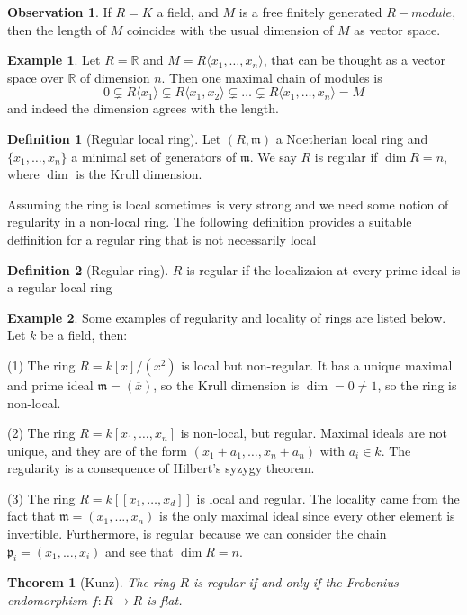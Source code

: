 \documentclass[leqno]{article}
\newtheorem{theorem}{Theorem}[section]
\theoremstyle{definition}
\newtheorem{definition}{Definition}[section]
\newtheorem{observation}{Observation}[section]
\newtheorem{example}{Example}[section]
\begin{document}
\begin{observation} If $R = K$ a field, and $M$ is a free finitely generated $R-module$, then the length of  $M$ coincides with the usual dimension of $M$ as vector space.
\end{observation}

\begin{example} Let $R = \mathbb{R}$ and $M = R\langle x_1, \ldots, x_n\rangle$, that can be thought as a vector space over $\mathbb{R}$ of dimension $n$. Then one maximal chain of modules is
  \[
  0\subsetneq R\langle x_1\rangle \subsetneq R \langle x_1 , x_2\rangle \subsetneq \ldots \subsetneq R\langle  x_1, \ldots, x_n \rangle = M
  \]
  and indeed the dimension agrees with the length.

\end{example}

\begin{definition}[Regular local ring] Let $(R, \mathfrak{m})$ a Noetherian local ring and $\{x_1, \ldots, x_n\}$ a minimal set of generators of $\mathfrak{m}$. We say $R$ is regular if $\dim R=n$, where  $\dim$ is the Krull dimension.
\end{definition}

Assuming the ring is local sometimes is very strong and we need some notion of regularity in a non-local ring. The following definition provides a suitable deffinition for a regular ring that is not necessarily local
\begin{definition}[Regular ring] $R$ is regular if the localizaion at every prime ideal is a regular local ring
\end{definition}

\begin{example} Some examples of regularity and locality of rings are listed below. Let $k$ be a field, then:

  (1) The ring $R = k[x] / (x^2)$ is local but non-regular. It has a unique maximal and prime ideal  $\mathfrak{m}=(\overline{x})$, so the Krull dimension is $\dim = 0\neq 1$, so the ring is non-local.

  (2) The ring $R = k[x_1, \ldots, x_n]$ is non-local, but regular. Maximal ideals are not unique, and they are of the form $(x_1+a_1, \ldots, x_n+a_n)$ with  $a_i\in k$. The regularity is a consequence of Hilbert's syzygy theorem.

  (3) The ring $R = k[[x_1, \ldots, x_d]]$ is local and regular. The locality came from the fact that $\mathfrak{m} = (x_1, \ldots, x_n)$ is the only maximal ideal since every other element is invertible. Furthermore, is regular because we can consider the chain $\mathfrak{p}_i = (x_1, \ldots, x_i)$ and see that $\dim R = n$.
\end{example}

\begin{theorem}[Kunz] The ring  $R$ is regular if and only if the Frobenius endomorphism $f:R\to R$ is flat.
\end{theorem}



\nocite{*}


\end{document}
